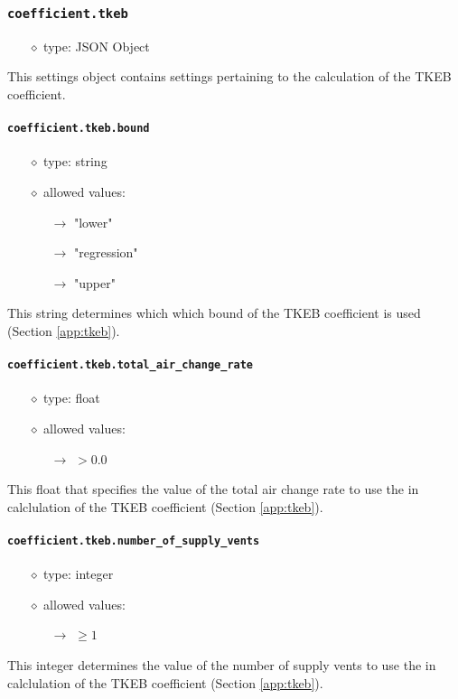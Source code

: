 \documentclass[]{article}
\def\code#1{\texttt{#1}}
\begin{document}
\subsubsection{\code{coefficient.tkeb}}\label{sec:coefftkeb}
\begin{itemize}
    \item[$\diamond$] type: JSON Object 
\end{itemize}
This settings object contains settings pertaining to the calculation of the TKEB
coefficient.

\paragraph{\code{coefficient.tkeb.bound}}
\begin{itemize}
    \item[$\diamond$] type: string 
    \item[$\diamond$] allowed values:
    \begin{itemize}
        \item[$\rightarrow$] "lower"
        \item[$\rightarrow$] "regression"
        \item[$\rightarrow$] "upper"
    \end{itemize}
\end{itemize}
This string determines which which bound of the TKEB coefficient is used
(Section \ref{app:tkeb}).

\paragraph{\code{coefficient.tkeb.total\_air\_change\_rate}}
\begin{itemize}
    \item[$\diamond$] type: float
    \item[$\diamond$] allowed values:
    \begin{itemize}
        \item[$\rightarrow$] $>0.0$
    \end{itemize}
\end{itemize}
This float that specifies the value of the total air change rate to use the in
calclulation of the TKEB coefficient (Section \ref{app:tkeb}).

\paragraph{\code{coefficient.tkeb.number\_of\_supply\_vents}}
\begin{itemize}
    \item[$\diamond$] type: integer 
    \item[$\diamond$] allowed values:
    \begin{itemize}
        \item[$\rightarrow$] $\geq 1$
    \end{itemize}
\end{itemize}
This integer determines the value of the number of supply vents to use the in
calclulation of the TKEB coefficient (Section \ref{app:tkeb}).
\end{document}

